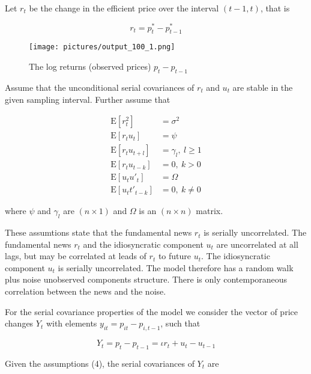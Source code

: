 \documentclass[a4paper,12pt]{article}
\newcommand{\E}{\mathrm{E}}
\begin{document}
    Let $r_t$ be the change in the efficient price over the interval $(t - 1, t)$, that is

    \begin{equation}
      r_t = p^*_t - p^*_{t - 1}
    \end{equation}

    \begin{figure}[h]
      \centering
      \texttt{[image: pictures/output\_100\_1.png]}
      \caption{The log returns (observed prices) $p_t - p_{t-1}$}
    \end{figure}

    Assume that the unconditional serial covariances of $r_t$ and $u_t$ are stable in the given sampling interval. Further assume that

    \begin{equation}
      \begin{split}
        \E[r^2_t] & = \sigma^2 \\
        \E[r_tu_t] & = \psi \\
        \E[r_tu_{t + l}] & = \gamma_l, \ l \ge 1 \\
        \E[r_tu_{t-k}] & = 0, \ k > 0 \\
        \E[u_tu'_t] & = \Omega \\
        \E[u_tt'_{t - k}] & = 0, \ k \ne 0
      \end{split}
    \end{equation}

    where $\psi$ and $\gamma_l$ are $(n \times 1)$ and $\Omega$ is an $(n \times n)$ matrix.

    These assumtions state that the fundamental news $r_t$ is serially uncorrelated. The fundamental news $r_t$ and the idiosyncratic component $u_t$ are uncorrelated at all lags, but may be correlated at leads of $r_t$ to future $u_t$. The idiosyncratic component $u_t$ is serially uncorrelated. The model therefore has a random walk plus noise unobserved components structure. There is only contemporaneous correlation between the news and the noise.

    For the serial covariance properties of the model we consider the vector of price changes $Y_t$ with elements $y_{it} = p_{it} - p_{i, t - 1}$, such that

    \begin{equation}
      Y_t = p_t - p_{t-1} = \iota r_t + u_t - u_{t - 1}
    \end{equation}

    Given the assumptions (4), the serial covariances of $Y_t$ are
\end{document}
